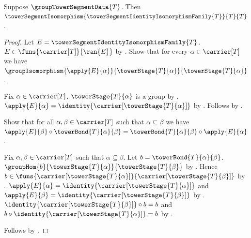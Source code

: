 \begin{theorem}\label{identity_tower_segment_isomorphism}
    Suppose $\groupTowerSegmentData{T}$.
    Then $\towerSegmentIsomorphism
        {\towerSegmentIdentityIsomorphismFamily{T}}{T}{T}$.
\end{theorem}
\begin{proof}
    Let $E=\towerSegmentIdentityIsomorphismFamily{T}$.
    $E\in\funs{\carrier[T]}{\ran{E}}$ by
        .
    Show that for every $\alpha\in\carrier[T]$ we have
        $\groupIsomorphism{\apply{E}{\alpha}}
            {\towerStage{T}{\alpha}}{\towerStage{T}{\alpha}}$.
    \begin{subproof}
        Fix $\alpha\in\carrier[T]$.
        $\towerStage{T}{\alpha}$ is a group by
            .
        $\apply{E}{\alpha}=\identity{\carrier[\towerStage{T}{\alpha}]}$
            by .
        Follows by .
    \end{subproof}
    Show that for all $\alpha,\beta\in\carrier[T]$ such that
        $\alpha\subseteq\beta$ we have
        $\apply{E}{\beta}\circ\towerBond{T}{\alpha}{\beta}=
            \towerBond{T}{\alpha}{\beta}\circ\apply{E}{\alpha}$.
    \begin{subproof}
        Fix $\alpha,\beta\in\carrier[T]$ such that $\alpha\subseteq\beta$.
        Let $b=\towerBond{T}{\alpha}{\beta}$.
        $\groupHom{b}{\towerStage{T}{\alpha}}{\towerStage{T}{\beta}}$
            by .
        Hence $b\in\funs{\carrier[\towerStage{T}{\alpha}]}
            {\carrier[\towerStage{T}{\beta}]}$ by
            .
        $\apply{E}{\alpha}=
            \identity{\carrier[\towerStage{T}{\alpha}]}$ and
        $\apply{E}{\beta}=
            \identity{\carrier[\towerStage{T}{\beta}]}$ by
            .
        $\identity{\carrier[\towerStage{T}{\beta}]}\circ b=b$ and
            $b\circ\identity{\carrier[\towerStage{T}{\alpha}]}=b$ by
            .
    \end{subproof}
    Follows by .
\end{proof}

